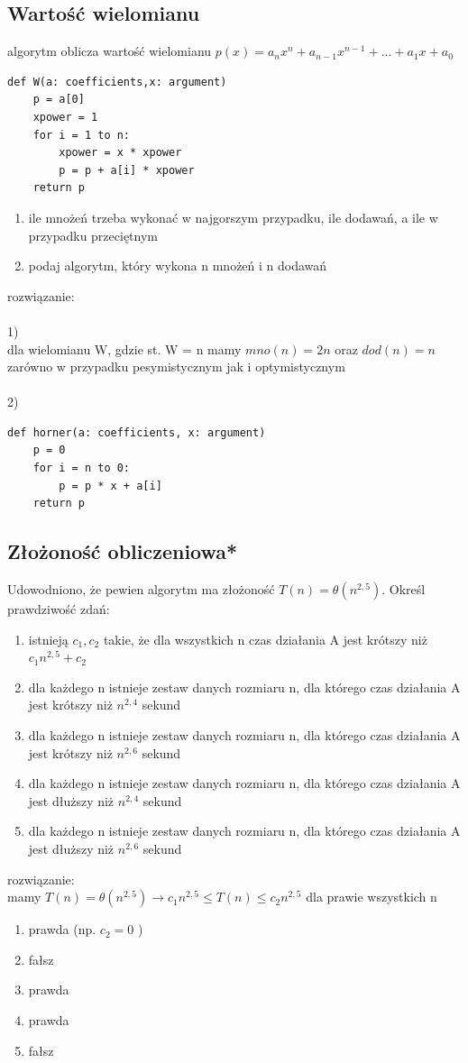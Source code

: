 \documentclass{article}
\begin{document}
\subsection*{Wartość wielomianu}
algorytm oblicza wartość wielomianu $p(x) = a_n x^n + a_{n-1} x^{n-1} + ... + a_1x + a_0$ 
\begin{lstlisting}
def W(a: coefficients,x: argument)
	p = a[0]
	xpower = 1
	for i = 1 to n:
		xpower = x * xpower	
		p = p + a[i] * xpower
	return p
\end{lstlisting}
\begin{enumerate}
	\item ile mnożeń trzeba wykonać w najgorszym przypadku, ile dodawań,  a ile w przypadku przeciętnym
	\item podaj algorytm, który wykona n mnożeń i n dodawań	
\end{enumerate}
rozwiązanie: \\\\
1)\\
dla wielomianu W, gdzie st. W = n mamy $mno(n) = 2n$ oraz $dod(n) = n$ zarówno w przypadku pesymistycznym jak i optymistycznym \\\\
2)
\begin{lstlisting}
def horner(a: coefficients, x: argument)
	p = 0
	for i = n to 0:
		p = p * x + a[i]
	return p
\end{lstlisting}
\subsection*{Złożoność obliczeniowa*}
Udowodniono, że pewien algorytm ma złożoność $T(n) = \theta(n^{2,5})$.  Określ prawdziwość zdań:
\begin{enumerate}
\item istnieją $c_1, c_2$ takie, że dla wszystkich n czas działania A jest krótszy niż $c_1n^{2,5} + c_2$ 
\item dla każdego n istnieje zestaw danych rozmiaru n, dla którego czas działania A jest krótszy niż $n^{2,4}$ sekund
\item dla każdego n istnieje zestaw danych rozmiaru n, dla którego czas działania A jest krótszy niż $n^{2,6}$ sekund
\item dla każdego n istnieje zestaw danych rozmiaru n, dla którego czas działania A jest dłuższy niż $n^{2,4}$ sekund
\item dla każdego n istnieje zestaw danych rozmiaru n, dla którego czas działania A jest dłuższy niż $n^{2,6}$ sekund
\end{enumerate} 
 rozwiązanie: \\
mamy $T(n) = \theta(n^{2,5}) \rightarrow c_1n^{2,5} \leq T(n) \leq c_2n^{2,5}$ dla prawie wszystkich n 
\begin{enumerate}
\item prawda (np. $c_2 = 0$ )
\item fałsz
\item prawda
\item prawda
\item fałsz
\end{enumerate}
\end{document}
